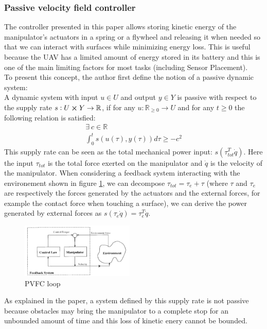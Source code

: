 \subsubsection{Passive velocity field controller}
The controller presented in this paper allows storing kinetic energy of the manipulator's actuators in a spring or a flywheel and releasing it when needed so that we can interact with surfaces while minimizing energy loss. This is useful because the UAV has a limited amount of energy stored in its battery and this is one of the main limiting factors for most tasks (including Sensor Placement). \\
To present this concept, the author first define the notion of a passive dynamic system:\\
A dynamic system with input $u \in U$ and output $y \in Y$ is passive with respect to the supply rate 
$s:U \cross Y \rightarrow \mathbb R$, if for any $u: \mathbb R_{\ge 0} \rightarrow U $ and for any $t\geq 0$ the following relation is satisfied:
\begin{align}
    \exists ~ c\in\mathbb R  \nonumber\\
    \int_{0}^{t}s(u(\tau),y(\tau))d\tau \geq -c^2
\end{align}
This supply rate can be seen as the total mechanical power input: $s(\tau_{tot}^{T}\dot{q})$. Here the input $\tau_{tot}$ is the total force exerted on the manipulator 
and $\dot{q}$ is the velocity of the manipulator.
When considering a feedback system interacting with the environement shown in figure \ref{fig:pvfccontrolloop}, we can decompose $\tau_{tot}=\tau_{e}+\tau$ (where $\tau$ and $\tau_{e}$ are respectively the forces generated by the actuators and the external forces, for example the contact force when touching a surface),
we can derive the power generated by external forces as $s(\tau_{e}\dot{q})=\tau_{e}^T \dot{q}$. 
\begin{figure}[h!]
    \centering
    \includegraphics[width=0.48\textwidth]{Images/pvfccontrolloop.png}
    \caption{PVFC loop \cite{li1999passive}}
    \label{fig:pvfccontrolloop}
\end{figure} 
As explained in the paper, a system defined by this supply rate is not passive because obstacles may bring the manipulator to a complete stop for an unbounded amount of time and this loss of kinetic enery cannot be bounded. 
